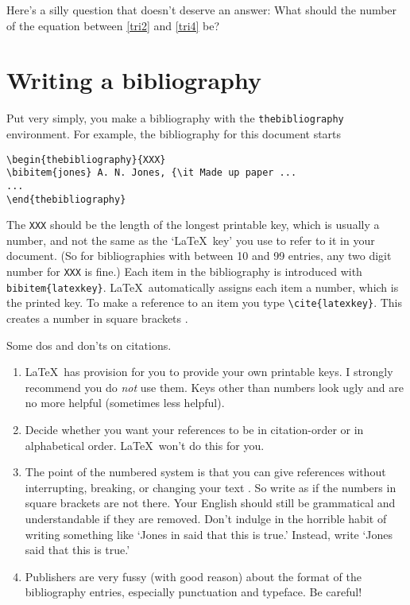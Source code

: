 \documentclass[a4paper]{article}
\begin{document}
Here's a silly question that doesn't deserve an answer:
What should the number of the equation between
\ref{tri2} and \ref{tri4} be?

\section{Writing a bibliography}

Put very simply, you make a bibliography with the
\texttt{thebibliography} environment.  For example, the
bibliography for this document starts
\begin{verbatim}
\begin{thebibliography}{XXX}
\bibitem{jones} A. N. Jones, {\it Made up paper ...
...
\end{thebibliography}  
\end{verbatim}

The \verb|XXX| should be
the length of the longest printable key, which is usually
a number, and not the same as the `\LaTeX\ key' you
use to refer to it in your document.  (So for
bibliographies with between 10 and 99 entries, any two digit number
for \verb|XXX| is fine.)  Each item in the bibliography
is introduced with \verb|bibitem{latexkey}|.  \LaTeX\ automatically
assigns each item a number, which is the printed key.  To make
a reference to an item you type \verb|\cite{latexkey}|.  This creates
a number in square brackets \cite{latexbook}.

Some dos and don'ts on citations.
\begin{enumerate}  
\item \LaTeX\ has provision for you
to provide your own printable keys.  
I strongly recommend you do {\it not\/}
use them.  Keys other than numbers look ugly and are no more
helpful (sometimes less helpful).
\item Decide whether you want your references to be in citation-order
or in alphabetical order. \LaTeX\ won't do this for you.\label{biborder}
\item The point of the numbered system is that you can give references
without interrupting, breaking, or changing your text \cite{bibtexguide}.
So write as if the numbers in square brackets are not there.  Your
English should still be grammatical and understandable if they are
removed.  Don't indulge in the horrible habit of writing something like
`Jones in \cite{jones} said that this is true.'  Instead, 
write `Jones \cite{jones} said that this is true.'
\item Publishers are very fussy (with good reason) about the format
of the bibliography entries, especially punctuation and typeface.
Be careful!
\end{enumerate}
\end{document}
